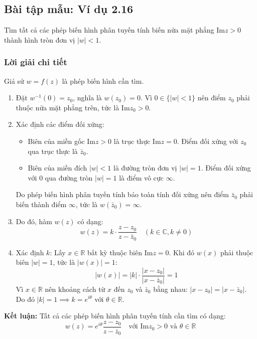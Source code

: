 \documentclass[12pt,a4paper]{article}
\begin{document}
\subsection*{Bài tập mẫu: Ví dụ 2.16}
Tìm tất cả các phép biến hình phân tuyến tính biến nửa mặt phẳng $\text{Im}z > 0$ thành hình tròn đơn vị $|w| < 1$.

\subsubsection*{Lời giải chi tiết}

Giả sử $w = f(z)$ là phép biến hình cần tìm.
\begin{enumerate}
    \item Đặt $w^{-1}(0) = z_0$, nghĩa là $w(z_0) = 0$. Vì $0 \in \{|w| < 1\}$ nên điểm $z_0$ phải thuộc nửa mặt phẳng trên, tức là $\text{Im}z_0 > 0$.
    
    \item Xác định các điểm đối xứng:
    \begin{itemize}
        \item Biên của miền gốc $\text{Im}z > 0$ là trục thực $\text{Im}z = 0$. Điểm đối xứng với $z_0$ qua trục thực là $\bar{z}_0$.
        \item Biên của miền đích $|w| < 1$ là đường tròn đơn vị $|w| = 1$. Điểm đối xứng với $0$ qua đường tròn $|w| = 1$ là điểm vô cực $\infty$.
    \end{itemize}
    Do phép biến hình phân tuyến tính bảo toàn tính đối xứng nên điểm $\bar{z}_0$ phải biến thành điểm $\infty$, tức là $w(\bar{z}_0) = \infty$.
    
    \item Do đó, hàm $w(z)$ có dạng:
    \[ w(z) = k \cdot \frac{z - z_0}{z - \bar{z}_0} \quad (k \in \mathbb{C}, k \neq 0) \]
    
    \item Xác định $k$:
    Lấy $x \in \mathbb{R}$ bất kỳ thuộc biên $\text{Im}z = 0$. Khi đó $w(x)$ phải thuộc biên $|w| = 1$, tức là $|w(x)| = 1$:
    \[ |w(x)| = |k| \cdot \frac{|x - z_0|}{|x - \bar{z}_0|} = 1 \]
    Vì $x \in \mathbb{R}$ nên khoảng cách từ $x$ đến $z_0$ và $\bar{z}_0$ bằng nhau: $|x - z_0| = |x - \bar{z}_0|$.
    Do đó $|k| = 1 \implies k = e^{i\theta}$ với $\theta \in \mathbb{R}$.
\end{enumerate}

\textbf{Kết luận:} Tất cả các phép biến hình phân tuyến tính cần tìm có dạng:
\[ w(z) = e^{i\theta} \frac{z - z_0}{z - \bar{z}_0} \quad \text{với } \text{Im}z_0 > 0 \text{ và } \theta \in \mathbb{R} \]
\end{document}
